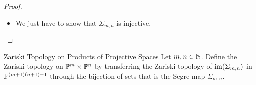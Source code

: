 \documentclass[a4paper]{article}
\begin{document}
\begin{prp}{}{}
\begin{proof}
\begin{itemize}
$$\begin{bmatrix}
x_my_0 & \cdots & x_my_n
\end{bmatrix}$$ I claim that $\im(\Sigma_{m,n})=\V(\{z_{ij}z_{kl}-z_{il}z_{kj}\;|\;1\leq i,k\leq m\text{ and }1\leq j,l\leq n\text{ and }i\neq k\text{ and }j\neq l\})$. Firstly, notice that if $\begin{bmatrix}
x_0y_0 & \cdots & x_0y_n\\
\vdots & \ddots & \vdots\\
x_my_0 & \cdots & x_my_n
\end{bmatrix}\in\im(\Sigma_{m,n})$ then it vanishes on $z_{ij}z_{kl}-z_{il}z_{kj}$ for $1\leq i\neq k\leq m$ and $1\leq j\neq l\leq n$. Indeed, the $(i,j)$th term on the matrix is given by $x_iy_j$. Hence $z_{ij}z_{kl}-z_{il}z_{kj}=x_iy_jx_ky_l-x_iy_lx_ky_j=0$. Hence $\im(\Sigma_{m,n})\subseteq\V(\{z_{ij}z_{kl}-z_{il}z_{kj}\})$. On the other hand, notice that the set of polynomials in the vanishing locus form a matrix $(z_{ij})$ whose all $2\times 2$ sub-determinants vanish. Thus every point in the vanishing locus is a an equivalence class of rank $1$ matrices that is equivalent up to scaling. By linear algebra*, every matrix $A$ of rank $1$ can be written as $$A=\begin{pmatrix}
a_0 \\ \vdots \\ a_m
\end{pmatrix}\begin{pmatrix}
b_0 & \cdots & b_n
\end{pmatrix}=\begin{pmatrix}
a_0b_0 & \cdots & a_0b_n\\
\vdots & \ddots & \vdots\\
a_mb_0 & \cdots & a_mb_n
\end{pmatrix}$$ which is in the image of $\Sigma_{m,n}$. Hence the image of the Segre map is a projective subvariety of $\Prj^{(m+1)(n+1)-1}$. 

\item We just have to show that $\Sigma_{m,n}$ is injective. 
\end{itemize}
\end{proof}
\end{prp}

\begin{defn}{Zariski Topology on Products of Projective Spaces}{} Let $m,n\in\mathbb{N}$. Define the Zariski topology on $\mathbb{P}^m\times\mathbb{P}^n$ by transferring the Zariski topology of $\operatorname{im}(\Sigma_{m,n})$ in $\Prj^{(m+1)(n+1)-1}$ through the bijection of sets that is the Segre map $\Sigma_{m,n}$. 
\end{defn}
\end{document}
